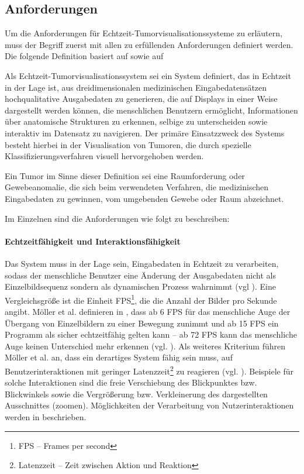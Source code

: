 \documentclass[ngerman,pdftex,paper=A4,DIV=calc,titlepage,12pt]{scrartcl}
\newtheorem[L]{boxedDefinition}{Definition}
\begin{document}
\subsection{Anforderungen}\label{ssec:requirements}
Um die Anforderungen für Echtzeit-Tumorvisualisationssysteme zu erläutern, muss der Begriff zuerst mit allen zu erfüllenden Anforderungen definiert werden. Die folgende Definition basiert auf \cite[Kapitel 3.1.1, Seite 17]{Bruckner2004} sowie auf \cite{Kutter2008}
\begin{boxedDefinition}\label{def:rttumorvissystem}
 Als Echtzeit-Tumorvisualisationssystem sei ein System definiert, das in Echtzeit in der Lage ist, aus dreidimensionalen medizinischen Eingabedatensätzen hochqualitative Ausgabedaten zu generieren, die auf Displays in einer Weise dargestellt werden können, die menschlichen Benutzern ermöglicht, Informationen über anatomische Strukturen zu erkennen, selbige zu unterscheiden sowie interaktiv im Datensatz zu navigieren. Der primäre Einsatzzweck des Systems besteht hierbei in der Visualisation von Tumoren, die durch spezielle Klassifizierungsverfahren visuell hervorgehoben werden.

 Ein Tumor im Sinne dieser Definition sei eine Raumforderung oder Gewebeanomalie, die sich beim verwendeten Verfahren, die medizinischen Eingabedaten zu gewinnen, vom umgebenden Gewebe oder Raum abzeichnet.
\end{boxedDefinition}
\newpage
\noindent Im Einzelnen sind die Anforderungen wie folgt zu beschreiben:
\paragraph{Echtzeitfähigkeit und Interaktionsfähigkeit} \label{p:rtcapability} Das System muss in der Lage sein, Eingabedaten in Echtzeit zu verarbeiten, sodass der menschliche Benutzer eine Änderung der Ausgabedaten nicht als Einzelbildsequenz sondern als dynamischen Prozess wahrnimmt (vgl \cite[Kapitel 1, Seite 1]{Moeller2008}). Eine Vergleichsgröße ist die Einheit FPS\footnote{FPS -- Frames per second}, die die Anzahl der Bilder pro Sekunde angibt. Möller et al. definieren in \cite{Moeller2008}, dass ab 6 FPS für das menschliche Auge der Übergang von Einzelbildern zu einer Bewegung zunimmt und ab 15 FPS ein Programm als sicher echtzeitfähig gelten kann -- ab 72 FPS kann das menschliche Auge keinen Unterschied mehr erkennen (vgl. \cite[Kapitel 1, Seite 1]{Moeller2008}). Als weiteres Kriterium führen Möller et al. an, dass ein derartiges System fähig sein muss, auf Benutzerinteraktionen mit geringer Latenzzeit\footnote{Latenzzeit -- Zeit zwischen Aktion und Reaktion} zu reagieren (vgl. \cite[Kapitel 1, Seite 1]{Moeller2008}). Beispiele für solche Interaktionen sind die freie Verschiebung des Blickpunktes bzw. Blickwinkels sowie die Vergrößerung bzw. Verkleinerung des dargestellten Ausschnittes (\glqq zoomen\grqq). Möglichkeiten der Verarbeitung von Nutzerinteraktionen werden in \cite[Kapitel 3.6, Seite 62-66]{Bruckner2004} beschrieben.
\end{document}

